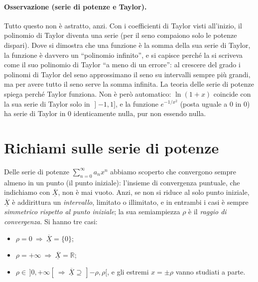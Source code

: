 \paragraph{Osservazione (serie di potenze e Taylor).}
Tutto questo non è astratto, anzi. Con i coefficienti di Taylor visti
all'inizio, il polinomio di Taylor diventa una serie (per il seno compaiono solo
le potenze dispari). Dove si dimostra che una funzione è la somma della sua
serie di Taylor, la funzione è davvero un ``polinomio infinito'', e si capisce
perché la si scriveva come il suo polinomio di Taylor ``a meno di un errore'':
al crescere del grado i polinomi di Taylor del seno approssimano il seno su
intervalli sempre più grandi, ma per avere tutto il seno serve la somma
infinita.
La teoria delle serie di potenze spiega perché Taylor funziona. Non è però
automatico: $\ln(1+x)$ coincide con la sua serie di Taylor solo in
$\mathopen{]}-1,1]$, e la funzione $e^{-1/x^2}$ (posta uguale a $0$ in $0$) ha
serie di Taylor in $0$ identicamente nulla, pur non essendo nulla.


\section{Richiami sulle serie di potenze}

Delle serie di potenze $\sum_{n=0}^{\infty} a_n x^n$ abbiamo scoperto che convergono sempre almeno in un
punto (il punto iniziale): l'insieme di convergenza puntuale, che indichiamo con $\overline{\underline{X}}$, non è mai vuoto.
Anzi, se non si riduce al solo punto iniziale, $\overline{\underline{X}}$ è addirittura un \emph{intervallo}, limitato o illimitato, e
in entrambi i casi è sempre \emph{simmetrico rispetto al punto iniziale}; la sua semiampiezza $\rho$ è il
\emph{raggio di convergenza}. Si hanno tre casi:
\begin{itemize}
  \item $\rho = 0 \ \Rightarrow\ \overline{\underline{X}} = \{0\}$;
  \item $\rho = +\infty \ \Rightarrow\ \overline{\underline{X}} = \mathbb{R}$;
  \item $\rho \in \,]0,+\infty[ \ \Rightarrow\ \overline{\underline{X}} \supseteq \,]{-\rho},\rho[$, e gli estremi $x=\pm\rho$ vanno
        studiati a parte.
\end{itemize}

